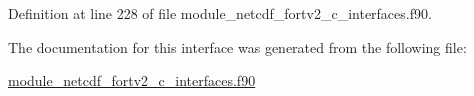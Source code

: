 Definition at line 228 of file module\+\_\+netcdf\+\_\+fortv2\+\_\+c\+\_\+interfaces.\+f90.



The documentation for this interface was generated from the following file\+:\begin{DoxyCompactItemize}
\item 
\hyperlink{module__netcdf__fortv2__c__interfaces_8f90}{module\+\_\+netcdf\+\_\+fortv2\+\_\+c\+\_\+interfaces.\+f90}\end{DoxyCompactItemize}
